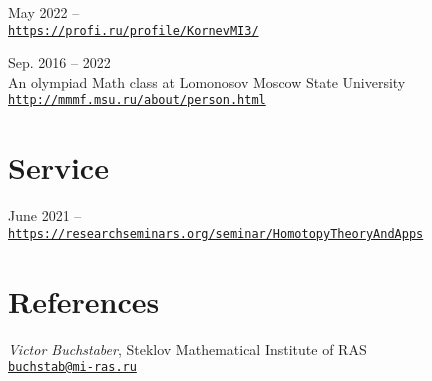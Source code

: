\documentclass[11pt,letterpaper]{report}
\newcommand{\listitemspace}{0.25em}
\renewenvironment{itemize}
{\begin{list}{}{\setlength{\leftmargin}{0em}
                \setlength{\parskip}{0em}
                \setlength{\itemsep}{\listitemspace}
                \setlength{\parsep}{\listitemspace}}}
{\end{list}}
\begin{document}
    \begin{tablist}
    
       \item{May 2022 --} \\ \href{https://profi.ru/profile/KornevMI3/}{\tt https://profi.ru/profile/KornevMI3/} 

        \item{Sep. 2016 -- 2022} \\ An olympiad Math class at Lomonosov Moscow State University\\ \href{http://mmmf.msu.ru/about/person.html}{\tt http://mmmf.msu.ru/about/person.html}
        
    \end{tablist}
    
    
   




    \section*{Service}

    \begin{tablist}

       \item{June 2021 --} \\ \href{https://researchseminars.org/seminar/HomotopyTheoryAndApps}{\tt https://researchseminars.org/seminar/HomotopyTheoryAndApps} 

    \end{tablist}
    
    
    
    
    
    \section*{References}

    \begin{itemize}

       \item[] {\it Victor Buchstaber}, Steklov Mathematical Institute of RAS\\ \href{mailto:buchstab@mi-ras.ru}{\tt buchstab@mi-ras.ru} 

    \end{itemize}
    
\end{document}
